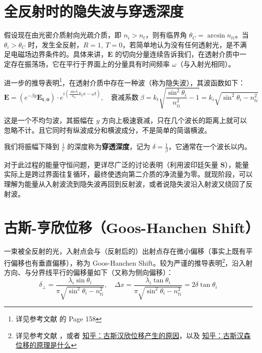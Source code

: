 \documentclass[UTF8]{report}
\theoremstyle{MyLineTheoremStyle} %
\theoremstyle{MyBlockTheoremStyle} %
\theoremstyle{MySubsubsectionStyle} %
\begin{document}
\section{全反射时的隐失波与穿透深度}

假设现在由光密介质射向光疏介质，即 $n_i > n_t$，则有临界角 $\theta_C = \arcsin n_{ti}$。当 $\theta_i > \theta_C$ 时，发生全反射，$R = 1,\ T = 0$，若简单地认为没有任何透射光，是不满足电磁场边界条件的。具体来讲，$\boldsymbol{E}$ 的切向分量连续告诉我们，在透射介质中一定存在振荡场，它在平行于界面上的分量具有时间频率 $\omega$（与入射光相同）。

进一步的推导表明\footnote{详见参考文献 \cite{Optics} 的 Page 158}，在透射介质中存在一种波（称为隐失波），其波函数如下：
\begin{equation}
\boldsymbol{E} = \left( e^{-\beta y} \boldsymbol{E_{t,0}}\right)\cdot e^{i\left( \frac{\sin \theta_i}{n_{ti}}  k_t x - \omega t \right)},\quad \text{衰减系数}\  \beta = k_t \sqrt{\frac{\sin^2 \theta_i}{n_{ti}^2} - 1} = k_i\sqrt{\sin^2 \theta_i - n_{ti}^2} 
\end{equation}

这是一个不均匀波，其振幅在 $y$ 方向上极速衰减，只在几个波长的距离上就可以忽略不计。且它同时有纵波成分和横波成分，不是简单的简谐横波。

我们将振幅下降到 $\frac{1}{e}$ 的深度称为\textbf{穿透深度}，记为 $\delta = \frac{1}{\beta} $，它通常在一个波长以内。

对于此过程的能量守恒问题，更详尽广泛的讨论表明（利用波印廷矢量 $\boldsymbol{S}$），能量实际上是跨过界面往复循环，最终使透向第二介质的净流量为零。就现阶段，可以理解为能量从入射波流到隐失波再回到反射波，或者说隐失波沿入射波又绕回了反射波。

\section{古斯-亨欣位移（Goos-Hanchen Shift）}

一束被全反射的光，入射点会与（反射后的）出射点存在微小偏移（事实上既有平行偏移也有垂直偏移），称为 Goos-Hanchen Shift。较为严谨的推导表明\footnote{详见参考文献 \cite{GHShift}，或者 \href{https://www.zhihu.com/question/446676895/answer/3407740051}{知乎：古斯汉欣位移产生的原因}，以及 \href{https://www.zhihu.com/question/620522351/answer/3209865128}{知乎：古斯汉森位移的原理是什么}}，沿入射方向、与分界线平行的偏移量如下（又称为侧向偏移）：
\begin{equation}
\delta_{\perp} = \frac{\lambda_i \sin \theta_i}{\pi \sqrt{\sin^2 \theta_i - n_{ti}^2} },\quad \Delta x =  \frac{\lambda_i \tan \theta_i}{\pi \sqrt{\sin^2 \theta_i - n_{ti}^2} } = 2 \delta \tan \theta_i 
\end{equation}
\end{document}
